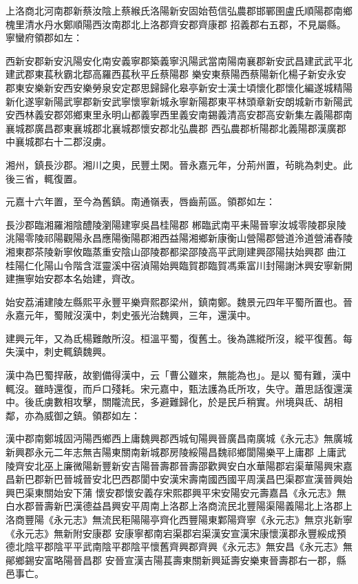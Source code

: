 \begin{pinyinscope}
 上洛商北河南郡新蔡汝陰上蔡緱氏洛陽新安固始苞信弘農郡邯鄲圉盧氏順陽郡南鄉槐里清水丹水鄭順陽西汝南郡北上洛郡齊安郡齊康郡
 招義郡右五郡，不見屬縣。寧蠻府領郡如左：



 西新安郡新安汎陽安化南安義寧郡築義寧汎陽武當南陽南襄郡新安武昌建武武平北建武郡東萇秋霸北鄀高羅西萇秋平丘蔡陽郡
 樂安東蔡陽西蔡陽新化楊子新安永安郡東安樂新安西安樂勞泉安定郡思歸歸化皋亭新安士漢士頃懷化郡懷化編遂城精陽新化遂寧新陽武寧郡新安武寧懷寧新城永寧新陽郡東平林頭章新安朗城新市新陽武
 安西林義安郡郊鄉東里永明山都義寧西里義安南錫義清高安郡高安新集左義陽郡南襄城郡廣昌郡東襄城郡北襄城郡懷安郡北弘農郡
 西弘農郡析陽郡北義陽郡漢廣郡中襄城郡右十二郡沒虜。



 湘州，鎮長沙郡。湘川之奧，民豐土閑。晉永嘉元年，分荊州置，茍眺為刺史。此後三省，輒復置。



 元嘉十六年置，至今為舊鎮。南通嶺表，唇齒荊區。領郡如左：



 長沙郡臨湘羅湘陰醴陵瀏陽建寧吳昌桂陽郡
 郴臨武南平耒陽晉寧汝城零陵郡泉陵洮陽零陵祁陽觀陽永昌應陽衡陽郡湘西益陽湘鄉新康衡山營陽郡營道泠道營浦舂陵湘東郡茶陵新寧攸臨蒸重安陰山邵陵郡都梁邵陵高平武剛建興邵陽扶始興郡
 曲江桂陽仁化陽山令階含洭靈溪中宿湞陽始興臨賀郡臨賀馮乘富川封陽謝沐興安寧新開建撫寧始安郡本名始建，齊改。



 始安荔浦建陵左縣熙平永豐平樂齊熙郡梁州，鎮南鄭。魏景元四年平蜀所置也。晉永嘉元年，蜀賊沒漢中，刺史張光治魏興，三年，還漢中。



 建興元年，又為氐楊難敵所沒。桓溫平蜀，復舊土。後為譙縱所沒，縱平復舊。每失漢中，刺史輒鎮魏興。



 漢中為巴蜀捍蔽，故劉備得漢中，云「曹公雖來，無能為也」。是以
 蜀有難，漢中輒沒。雖時還復，而戶口殘耗。宋元嘉中，甄法護為氐所攻，失守。蕭思話復還漢中。後氐虜數相攻擊，關隴流民，多避難歸化，於是民戶稍實。州境與氐、胡相鄰，亦為威御之鎮。領郡如左：



 漢中郡南鄭城固沔陽西鄉西上庸魏興郡西城旬陽興晉廣昌南廣城《永元志》無廣城新興郡永元二年志無吉陽東關南新城郡房陵綏陽昌魏祁鄉閬陽樂平上庸郡
 上庸武陵齊安北巫上廉微陽新豐新安吉陽晉壽郡晉壽邵歡興安白水華陽郡宕渠華陽興宋嘉昌新巴郡新巴晉城晉安北巴西郡閬中安漢宋壽南國西國平周漢昌巴渠郡宣漢晉興始興巴渠東關始安下蒲
 懷安郡懷安義存宋熙郡興平宋安陽安元壽嘉昌《永元志》無白水郡晉壽新巴漢德益昌興安平周南上洛郡上洛商流民北豐陽渠陽義陽北上洛郡上洛商豐陽《永元志》無流民秬陽陽亭齊化西豐陽東鄴陽齊寧《永元志》無京兆新寧《永元志》無新附安康郡
 安康寧都南宕渠郡宕渠漢安宣漢宋康懷漢郡永豐綏成預德北陰平郡陰平平武南陰平郡陰平懷舊齊興郡齊興《永元志》無安昌《永元志》無鄖鄉錫安富略陽晉昌郡
 安晉宣漢吉陽萇壽東關新興延壽安樂東晉壽郡右一郡，縣邑事亡。




\end{pinyinscope}
